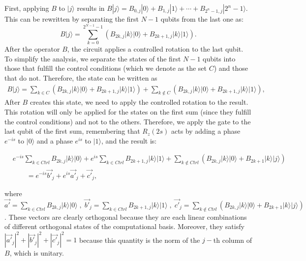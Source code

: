 \documentclass[10pt,letterpaper]{article} %
\begin{document}
First, applying $B$ to $|j\rangle$ results in $B|j\rangle = B_{0,j} |0\rangle + B_{1,j} |1 \rangle + \cdots + B_{2^n-1,j}|2^n-1\rangle$.
This can be rewritten by separating the
first $N-1$ qubits from the last one as:
\begin{equation}
B|j\rangle = \sum_{k=0}^{2^{N-1}-1} \left( B_{2k,j} |k\rangle |0\rangle + B_{2k+1,j} |k\rangle |1 \rangle \right).
\end{equation}
After the operator $B$, the circuit applies a controlled rotation to the last qubit.
To simplify the analysis, we separate the states of
the first $N-1$ qubits into those that fulfill the control conditions 
(which we denote as the set $C$)
and those that do not.
Therefore, the state can be written as
\begin{eqnarray}
B|j\rangle = \sum_{k \in C} \left(B_{2k,j} |k\rangle |0\rangle + B_{2k+1,j} |k\rangle |1 \rangle \right) + \sum_{k \not\in C} \left( B_{2k,j} |k\rangle |0\rangle + B_{2k+1,j}|k\rangle |1\rangle \right),
\end{eqnarray}
After $B$ creates this state, we need to apply the controlled rotation to the result. 
This rotation will only be applied for the states on the first sum (since they fulfill the control conditions)
and not to the others. Therefore, we apply the gate to the last qubit of the first sum, 
remembering that $R_z(2s)$ acts by adding a phase $e^{-is}$ to $|0\rangle$
and a phase $e^{is}$ to $|1\rangle$, and the result is:
\begin{small}
\begin{eqnarray}
&e^{-is} \sum_{k \in Ctrl} B_{2k,j} |k\rangle |0\rangle + e^{is} \sum_{k \in Ctrl} B_{2k+1,j} |k\rangle |1 \rangle 
+ \sum_{k \not\in Ctrl} \left( B_{2k,j} |k\rangle |0\rangle + B_{2k+1} |k\rangle |j \rangle \right)\\
& \qquad = e^{-is} \vec{b'}_j + e^{is} \vec{a'}_j + \vec{c'}_j,
\end{eqnarray}
\end{small}
where $\vec{a'} = \sum_{k \in Ctrl} B_{2k,j}|k\rangle|0\rangle \;,\; \vec{b'}_j = \sum_{k \in Ctrl} B_{2k+1,j} |k\rangle |1 \rangle \;,\; \vec{c'}_j =\sum_{k \not\in Ctrl} \left( B_{2k,j} |k\rangle |0\rangle + B_{2k+1} |k\rangle |j \rangle \right)$.
 These vectors are clearly orthogonal because they are each linear combinations of different 
orthogonal states of the computational basis. 
Moreover, they satisfy $|\vec{a'}_j|^2 + |\vec{b'}_j|^2 + |\vec{c'}_j|^2 = 1$ because this quantity is the norm of the $j-$th column of $B$, 
which is unitary.
\end{document}
